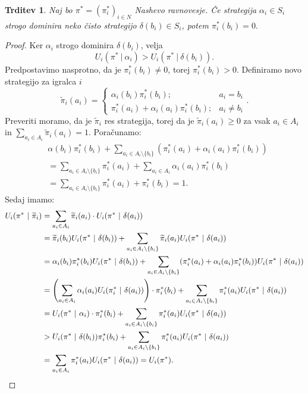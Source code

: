 \documentclass[10pt, a4paper]{article}
\newtheorem{trditev}[izr]{Trditev}
\newenvironment{noticeC}{%
  \tcolorbox[%
  notitle,
  empty,
  enhanced,  %
  breakable,
  coltext=black, 
  fontupper=\rmfamily,
  parbox=false,
  noparskip,
  sharp corners,
  boxrule=-1pt,  %
  frame hidden,
  left=7pt,  %
  right=7pt,
  top=5pt,
  bottom=5pt,
  before skip=2.5ex plus 2pt,
  after skip=2.5ex plus 2pt,
  overlay unbroken and last={%
  },
  ]}
{\endtcolorbox}
\newenvironment{dokaz}%
  {\begin{noticeC}\begin{proof}}%
  {\end{proof}\end{noticeC}}
\begin{document}
\begin{trditev}
  Naj bo $\pi^* = (\pi_i^*)_{i \in N}$ Nashevo ravnovesje.
  Če strategija $\alpha_i \in S_i$ strogo dominira neko čisto strategijo 
  $\delta(b_i) \in S_i$, potem $\pi_i^* (b_i) = 0.$
\end{trditev}

\begin{dokaz}
  Ker $\alpha_i$ strogo dominira $\delta(b_i)$, velja 
  $$U_i (\pi^*\ |\ \alpha_i) > U_i (\pi^*\ |\ \delta(b_i)).$$
  Predpostavimo nasprotno, da je $\pi_i^* (b_i) \neq 0$, torej $\pi_i^* (b_i) > 0$.
  Definiramo novo strategijo za igralca $i$
  $$\widetilde{\pi}_i (a_i) = \begin{cases}
    \alpha_i (b_i) \pi_i^*(b_i); & a_i = b_i\\
    \pi^* _i (a_i) + \alpha_i (a_i) \pi^*_i (b_i); & a_i \neq b_i
  \end{cases}.$$
  Preveriti moramo, da je $\widetilde{\pi}_i $ res strategija, torej da je $\widetilde{\pi}_i (a_i) \geq 0$ za vsak $a_i \in A_i$ in 
  $\sum_{a_i \in A_i} \widetilde{\pi}_i (a_i) = 1.$
  Poračunamo:
  \begin{align*}
    &\alpha(b_i) \pi_i^* (b_i) + \sum_{a_i \in A_i \setminus \{b_i\}} \left(\pi_i^* (a_i) + \alpha_i (a_i) \pi_i^* (b_i)\right)\\
    &= \sum_{a_i \in A_i \setminus \{b_i\}} \pi_i^* (a_i) + \sum_{a_i \in A_i} \alpha_i (a_i) \pi_i^* (b_i)\\
    &= \sum_{a_i \in A_i \setminus \{b_i\}} \pi_i^* (a_i) + \pi_i^* (b_i) = 1.
  \end{align*} 
  Sedaj imamo:
  \begin{align*}
    U_i (\pi^*\ |\ \widetilde{\pi}_i) &= \sum_{a_i \in A_i} \widetilde{\pi}_i (a_i) \cdot U_i (\pi^*\ |\ \delta(a_i))\\
    &= \widetilde{\pi}_i (b_i) U_i (\pi^*\ |\ \delta(b_i)) + \sum_{a_i \in A_i \setminus \{b_i\}} \widetilde{\pi}_i (a_i) U_i (\pi^*\ |\ \delta (a_i))\\
    &= \alpha_i (b_i) \pi_i ^* (b_i) U_i (\pi^*\ |\ \delta(b_i)) + \sum_{a_i \in A_i \setminus \{b_i\}} (\pi_i ^* (a_i) + \alpha_i(a_i) \pi_i^*(b_i)) U_i (\pi^*\ |\ \delta (a_i))\\
    &= \left( \sum_{a_i \in A_i} \alpha_i (a_i) U_i (\pi_i ^*\ |\ \delta(a_i)) \right) \cdot \pi_i^* (b_i) + \sum_{a_i \in A_i \setminus \{b_i\}} \pi_i^* (a_i) U_i (\pi^*\ |\ \delta(a_i))\\
    &= U_i (\pi^*\ |\ \alpha_i) \cdot \pi_i ^* (b_i) + \sum_{a_i \in A_i \setminus \{b_i\}} \pi_i^* (a_i) U_i (\pi^*\ |\ \delta(a_i))\\
    &> U_i (\pi^*\ |\ \delta(b_i)) \pi_i ^* (b_i) + \sum_{a_i \in A_i \setminus \{b_i\}} \pi_i^* (a_i) U_i (\pi^*\ |\ \delta(a_i))\\
    &= \sum_{a_i \in A_i} \pi_i^* (a_i) U_i (\pi^*\ |\ \delta(a_i)) = U_i (\pi^*). \qedhere
  \end{align*}
\end{dokaz}
\end{document}
